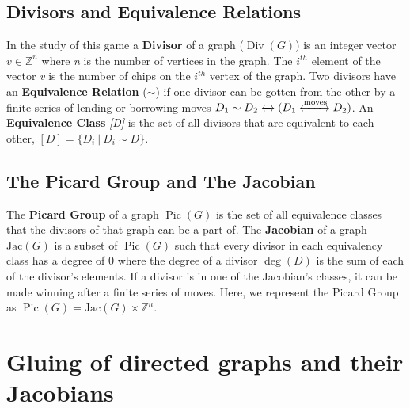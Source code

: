\documentclass[11pt,reqno]{amsart}
\DeclareMathOperator{\Pic}{Pic}
\DeclareMathOperator{\Div}{Div}
\DeclareMathOperator{\Deg}{deg}
\newcommand{\Jac}{\textrm{Jac}}{}
\theoremstyle{definition}
\theoremstyle{plain}
\begin{document}
	\subsection{Divisors and Equivalence Relations}
		In the study of this game a \textbf{Divisor} of a graph ($\Div(G)$) is an integer vector $v\in\mathbb{Z}^n$
		where \textit{n} is the number of vertices in the graph.  The $i^{th}$ element of the vector \textit{v}
		is the number of chips on the $i^{th}$ vertex of the graph.  Two divisors have an \textbf{Equivalence Relation}
		($\sim$) if one divisor can be gotten from the other by a finite series of lending or borrowing moves
		$D_1 \sim D_2 \xleftrightarrow{} (D_1 \xleftrightarrow{\text{moves}} D_2)$.  An \textbf{Equivalence Class} \textit{[D]}
		is the set of all divisors that are equivalent to each other, $[D] = \{D_i~|~D_i \sim D\}$.

	\subsection{The Picard Group and The Jacobian}
		The \textbf{Picard Group} of a graph $\Pic(G)$ is the set of all equivalence classes that the
		divisors of that graph can be a  part of. The \textbf{Jacobian} of a graph  $\Jac(G)$ is a subset
		of $\Pic(G)$ such that every divisor in each equivalency class has a degree of $0$ where the
		degree of a divisor $\Deg(D)$ is the sum of each of the divisor's elements.
		If a divisor is in one of the Jacobian's classes, it can be made winning after a finite series of moves.
		Here, we represent the Picard Group as $\Pic(G)=\Jac(G)\times\mathbb{Z}^n$.


\section{Gluing of directed graphs and their Jacobians}
\end{document}
